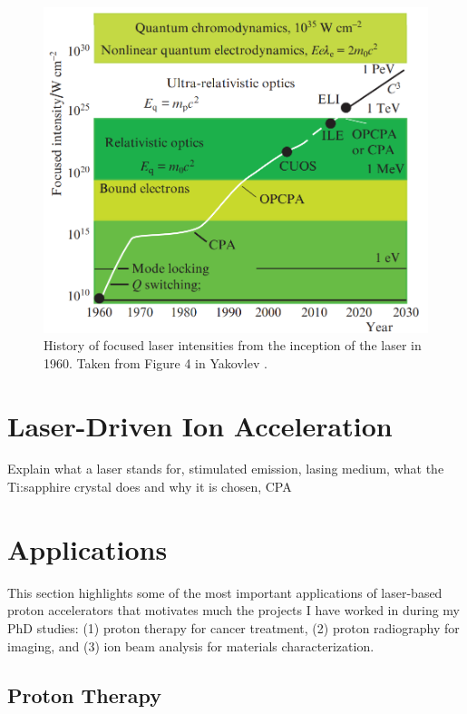 \begin{figure}
	\centering
	\includegraphics[width=0.75\linewidth]{planning/images/laser_history.PNG}
	\caption{History of focused laser intensities from the inception of the laser in 1960. Taken from Figure 4 in Yakovlev \cite{Yakovlev_2014_QE}.}
	\label{fig:laser_history}
\end{figure}

\section{Laser-Driven Ion Acceleration}

Explain what a laser stands for, stimulated emission, lasing medium, what the Ti:sapphire crystal does and why it is chosen, CPA


\section{Applications}

This section highlights some of the most important applications of laser-based proton accelerators that motivates much the projects I have worked in during my PhD studies: (1) proton therapy for cancer treatment, (2) proton radiography for imaging, and (3) ion beam analysis for materials characterization.


\subsection{Proton Therapy}

